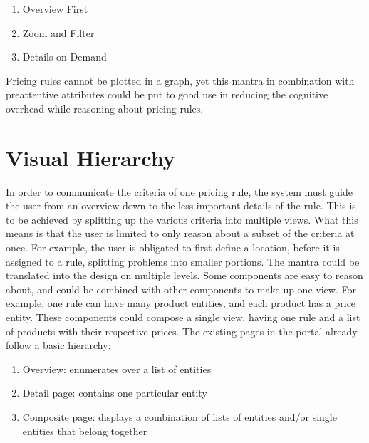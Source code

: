 \begin{enumerate}
	\item Overview First
	\item Zoom and Filter
	\item Details on Demand
\end{enumerate}

Pricing rules cannot be plotted in a graph, yet this mantra in combination with preattentive attributes could be put to good use in reducing the cognitive overhead while reasoning about pricing rules.

\section{Visual Hierarchy}
In order to communicate the criteria of one pricing rule, the system must guide the user from an overview down to the less important details of the rule. This is to be achieved by splitting up the various criteria into multiple views. What this means is that the user is limited to only reason about a subset of the criteria at once. For example, the user is obligated to first define a location, before it is assigned to a rule, splitting problems into smaller portions. The mantra could be translated into the design on multiple levels. Some components are easy to reason about, and could be combined with other components to make up one view. For example, one rule can have many product entities, and each product has a price entity. These components could compose a single view, having one rule and a list of products with their respective prices. The existing pages in the portal already follow a basic hierarchy:

\begin{enumerate}
	\item Overview: enumerates over a list of entities
	\item Detail page: contains one particular entity
	\item Composite page: displays a combination of lists of entities and/or single entities that belong together
\end{enumerate}

